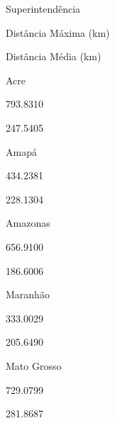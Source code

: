\documentclass[
  letterpaper,
]{report}
\begin{document}
\n  

\n    

\n      

Superintendência

\n      

Distância Máxima (km)

\n      

Distância Média (km)

\n    

\n  

\n  

\n    

\n      

Acre

\n      

793.8310

\n      

247.5405

\n    

\n    

\n      

Amapá

\n      

434.2381

\n      

228.1304

\n    

\n    

\n      

Amazonas

\n      

656.9100

\n      

186.6006

\n    

\n    

\n      

Maranhão

\n      

333.0029

\n      

205.6490

\n    

\n    

\n      

Mato Grosso

\n      

729.0799

\n      

281.8687

\n    

\n    

\n      
\end{document}
